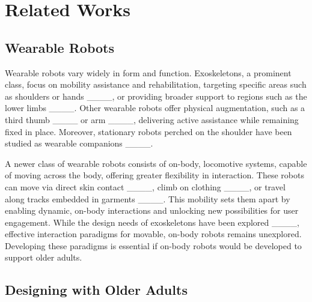 \section{Related Works}
\subsection{Wearable Robots}

Wearable robots vary widely in form and function. Exoskeletons, a prominent class, focus on mobility assistance and rehabilitation, targeting specific areas such as shoulders or hands ____, or providing broader support to regions such as the lower limbs ____. Other wearable robots offer physical augmentation, such as a third thumb ____ or arm ____, delivering active assistance while remaining fixed in place. Moreover, stationary robots perched on the shoulder have been studied as wearable companions ____.



A newer class of wearable robots consists of on-body, locomotive systems, capable of moving across the body, offering greater flexibility in interaction. These robots can move via direct skin contact ____, climb on clothing ____, or travel along tracks embedded in garments ____. This mobility sets them apart by enabling dynamic, on-body interactions and unlocking new possibilities for user engagement. While the design needs of exoskeletons have been explored ____, effective interaction paradigms for movable, on-body robots remains unexplored. Developing these paradigms is essential if on-body robots would be developed to support older adults.

\subsection{Designing with Older Adults}

